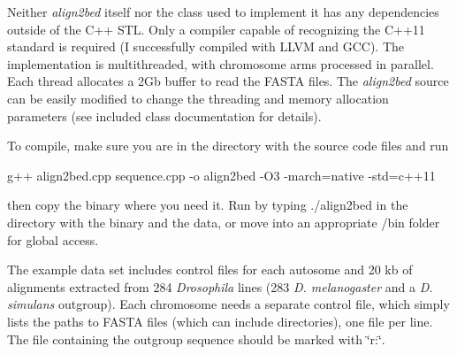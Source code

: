 Neither {\itshape align2bed} itself nor the class used to implement it has any dependencies outside of the C++ S\+TL. Only a compiler capable of recognizing the C++11 standard is required (I successfully compiled with L\+L\+VM and G\+CC). The implementation is multithreaded, with chromosome arms processed in parallel. Each thread allocates a 2\+Gb buffer to read the F\+A\+S\+TA files. The {\itshape align2bed} source can be easily modified to change the threading and memory allocation parameters (see included class documentation for details).

To compile, make sure you are in the directory with the source code files and run \begin{DoxyVerb}g++ align2bed.cpp sequence.cpp -o align2bed -O3 -march=native -std=c++11
\end{DoxyVerb}


then copy the binary where you need it. Run by typing {\ttfamily ./align2bed} in the directory with the binary and the data, or move into an appropriate /bin folder for global access.

The example data set includes control files for each autosome and 20 kb of alignments extracted from 284 {\itshape Drosophila} lines (283 {\itshape D. melanogaster} and a {\itshape D. simulans} outgroup). Each chromosome needs a separate control file, which simply lists the paths to F\+A\+S\+TA files (which can include directories), one file per line. The file containing the outgroup sequence should be marked with \char`\"{}r\+:\char`\"{}. 